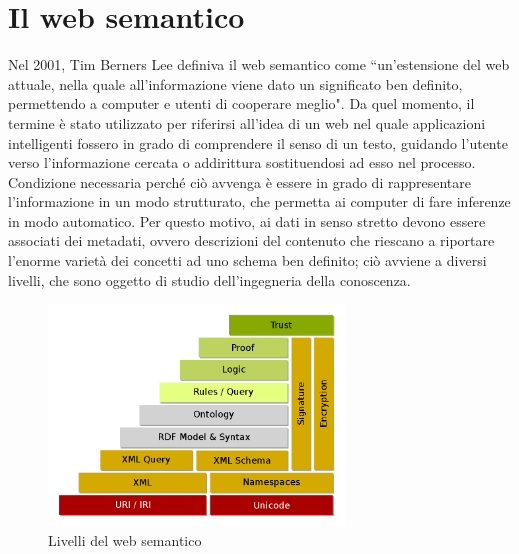 \documentclass[12pt,a4paper]{report}
\begin{document}
\section{Il web semantico}
Nel 2001, Tim Berners Lee definiva il web semantico come ``un'estensione del web attuale, nella quale all'informazione viene dato un significato ben definito, permettendo a computer e utenti di cooperare meglio"\cite{semanticWebPaper}.
Da quel momento, il termine è stato utilizzato per riferirsi all'idea di un web nel quale applicazioni intelligenti fossero in grado di comprendere il senso di un testo, guidando l'utente verso l'informazione cercata o addirittura sostituendosi ad esso nel processo.
Condizione necessaria perché ciò avvenga è essere in grado di rappresentare l'informazione in un modo strutturato, che permetta ai computer di fare inferenze in modo automatico. Per questo motivo, ai dati in senso stretto devono essere associati dei metadati, ovvero descrizioni del contenuto che riescano a riportare l'enorme varietà dei concetti ad uno schema ben definito; ciò avviene a diversi livelli, che sono oggetto di studio dell'ingegneria della conoscenza.

\begin{figure}[h]	
\centering
\includegraphics[width=0.7\textwidth]{images/semanticweblayers.png}
\caption{Livelli del web semantico}
\end{figure}
\end{document}
